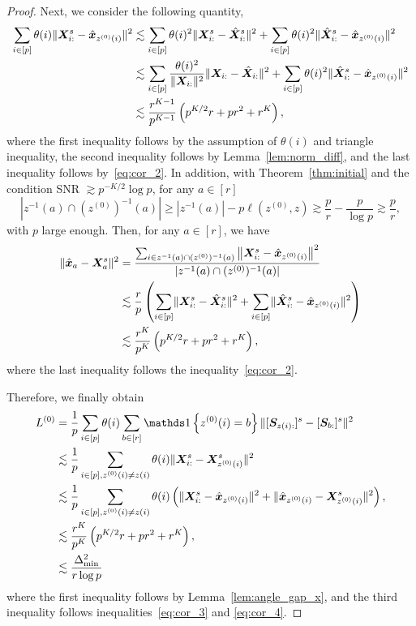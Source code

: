 \documentclass[lettersize,onecolumn,journal]{IEEEtran}
\theoremstyle{definition}
\theoremstyle{definition}
\newcommand{\of}[1]{\left(#1\right)}
\newcommand{\offf}[1]{\left\{#1\right\}}
\begin{document}
\begin{proof}
{Next, we consider the following quantity,
\begin{align}
    \sum_{i \in [p]} \theta(i) \onormSize{}{ \mX_{i:}^s - \hat \mx_{z^{(0)}(i)}}^2 &\lesssim \sum_{i \in [p]} \theta(i)^2 \onormSize{}{\mX_{i:}^s - \hat \mX_{i:}^s}^2 + \sum_{i \in [p]} \theta(i)^2 \onormSize{}{\hat \mX_{i:}^s - \hat \mx_{z^{(0)}(i)} }^2\\
    & \lesssim \sum_{i \in [p]} \frac{ \theta(i)^2}{ \onormSize{}{\mX_{i:}}^2} \onormSize{}{\mX_{i:}  - \hat \mX_{i:}}^2 +  \sum_{i \in [p]} \theta(i)^2 \onormSize{}{\hat \mX_{i:}^s - \hat \mx_{z^{(0)}(i)} }^2\\
    & \lesssim \frac{r^{K-1}}{p^{K-1}} \of{ p^{K/2}r + pr^2 + r^K} ,\label{eq:cor_3}
\end{align}
where the first inequality follows by the assumption of $\theta(i)$ and triangle inequality, the second inequality follows by Lemma~\ref{lem:norm_diff}, and the last inequality follows by~\eqref{eq:cor_2}. In addition, with Theorem~\ref{thm:initial} and the condition SNR $\gtrsim p^{-K/2} \log p$, for any $a \in [r]$
\begin{equation}
    |z^{-1}(a) \cap (z^{(0)})^{-1} (a)| \geq |z^{-1}(a)| - p\ell(z^{(0)} ,  z) \gtrsim \frac{p}{r} - \frac{p}{\log p} \gtrsim \frac{p}{r},
\end{equation}
with $p$ large enough. Then, for any $a \in [r]$, we have 
\begin{align}
       \onormSize{}{ \hat \mx_{a} - \mX_{a}^s  }^2  &= \frac{ \sum_{i \in z^{-1}(a) \cap (z^{(0)})^{-1} (a) } \onorm{ \mX_{i:}^s - \hat \mx_{z^{(0)}(i)}}^2 }{|z^{-1}(a) \cap (z^{(0)})^{-1} (a) |}  \\
       & \lesssim \frac{r}{p} \of{  \sum_{i \in [p]} \onormSize{}{ \mX_{i:}^s - \hat \mX_{i:}^s }^2 + \sum_{i \in [p]} \onormSize{}{\hat \mX_{i:}^s - \hat \mx_{z^{(0)}(i)}}^2 } \\
       & \lesssim  \frac{r^{K}}{p^{K}}\of{ p^{K/2}r + pr^2 + r^K}, \label{eq:cor_4}
\end{align}
where the last inequality follows the inequality~\eqref{eq:cor_2}.

Therefore, we finally obtain 
\begin{align}
     L^{(0)} &= \frac{1}{p}  \sum_{i \in [p]} \theta(i) \sum_{b \in [r]}  \ind \offf{ z^{(0)}(i) = b } \onormSize{}{ [ \mS_{  z(i):}  ]^s - [ \mS_{b:}  ]^s  }^2 \\
     & \lesssim \frac{1}{p}  \sum_{i \in [p], z^{(0)}(i) \neq z(i)} \theta(i)  \onormSize{}{ \mX_{i:}^s -  \mX_{z^{(0)}(i)}^s  }^2\\
     & \lesssim \frac{1}{p}  \sum_{i \in [p], z^{(0)}(i) \neq z(i)} \theta(i) \of{ \onormSize{}{\mX_{i:}^s - \hat \mx_{z^{(0)}(i)}}^2 + \onormSize{}{ \hat \mx_{z^{(0)}(i)} - \mX_{z^{(0)}(i)}^s  }^2 }, \\
     & \lesssim \frac{r^{K}}{p^{K}} \of{ p^{K/2}r + pr^2 + r^K}, \\
     & \lesssim \frac{\Delta_{\min}^2}{r \log p}
\end{align}
where the first inequality follows by Lemma~\ref{lem:angle_gap_x}, and the third inequality follows inequalities~\eqref{eq:cor_3} and \eqref{eq:cor_4}.


}
\end{proof}
\end{document}
